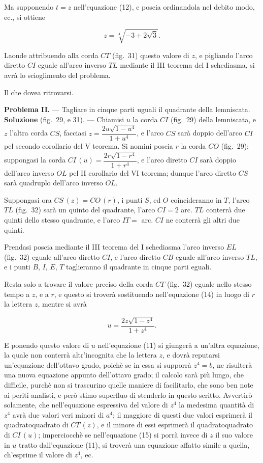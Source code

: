 \documentclass{article}
\begin{document}

Ma supponendo $t = z$ nell'equazione (12), e poscia ordinandola nel debito modo, ec., si ottiene

\[ z = \sqrt[4]{-3+2\sqrt{3}}. \]

Laonde attribuendo alla corda $CT$ (fig.~31) questo valore di $z$, e pigliando l'arco diretto $CI$
eguale all'arco inverso $TL$ mediante il III teorema del I schediasma, si avrà lo scioglimento del
problema.

Il che dovea ritrovarsi.

\textbf{Problema II.} --- Tagliare in cinque parti uguali il quadrante della lemniscata.
\textbf{Soluzione} (fig.~29, e 31). --- Chiamisi $u$ la corda $CI$ (fig.~29) della lemniscata, e
$z$ l'altra corda $CS$, facciasi $z = \dfrac{2u\sqrt{1-u^{4}}}{1+u^{4}}$, e l'arco $CS$ sarà doppio
dell'arco $CI$ pel secondo corollario del V teorema. Si nomini poscia $r$ la corda $CO$ (fig.~29);
suppongasi la corda $CI\,(u) = \dfrac{2r\sqrt{1-r^{4}}}{1+r^{4}}$, e l'arco diretto $CI$ sarà
doppio dell'arco inverso $OL$ pel II corollario del VI teorema; dunque l'arco diretto $CS$ sarà
quadruplo dell'arco inverso $OL$.

Suppongasi ora $CS\,(z) = CO\,(r)$, i punti $S$, ed $O$ coincideranno in $T$, l'arco $TL$
(fig.~32) sarà un quinto del quadrante, l'arco $CI = 2$ arc. $TL$ conterrà due quinti dello stesso
quadrante, e l'arco $IT = $ arc. $CI$ ne conterrà gli altri due quinti.

Prendasi poscia mediante il III teorema del I schediasma l'arco inverso $EL$ (fig.~32) eguale
all'arco diretto $CI$, e l'arco diretto $CB$ eguale all'arco inverso $TL$, e i punti $B$, $I$,
$E$, $T$ taglieranno il quadrante in cinque parti eguali.

Resta solo a trovare il valore preciso della corda $CT$ (fig.~32) eguale nello stesso tempo a
$z$, e a $r$, e questo si troverà sostituendo nell'equazione (14) in luogo di $r$ la lettera $z$,
mentre si avrà

\[ u = \frac{2z\sqrt{1-z^{4}}}{1+z^{4}}. \tag{15} \]

E ponendo questo valore di $u$ nell'equazione (11) si giungerà a un'altra equazione, la quale non
conterrà altr'incognita che la lettera $z$, e dovrà reputarsi un'equazione dell'ottavo grado,
poichè se in essa si supporrà $z^{4} = b$, ne risulterà una nuova equazione appunto dell'ottavo
grado; il calcolo sarà più lungo, che difficile, purchè non si trascurino quelle maniere di
facilitarlo, che sono ben note ai periti analisti, e però stimo superfluo di stenderlo in questo
scritto. Avvertirò solamente, che nell'equazione espressiva del valore di $z^{4}$ la medesima
quantità di $z^{4}$ avrà due valori veri minori di $a^{4}$; il maggiore di questi due valori
esprimerà il quadratoquadrato di $CT\,(z)$, e il minore di essi esprimerà il quadratoquadrato di
$CI\,(u)$; imperciocchè se nell'equazione (15) si porrà invece di $z$ il suo valore in $u$ tratto
dall'equazione (11), si troverà una equazione affatto simile a quella, ch'esprime il valore di
$z^{4}$, ec.
\end{document}
